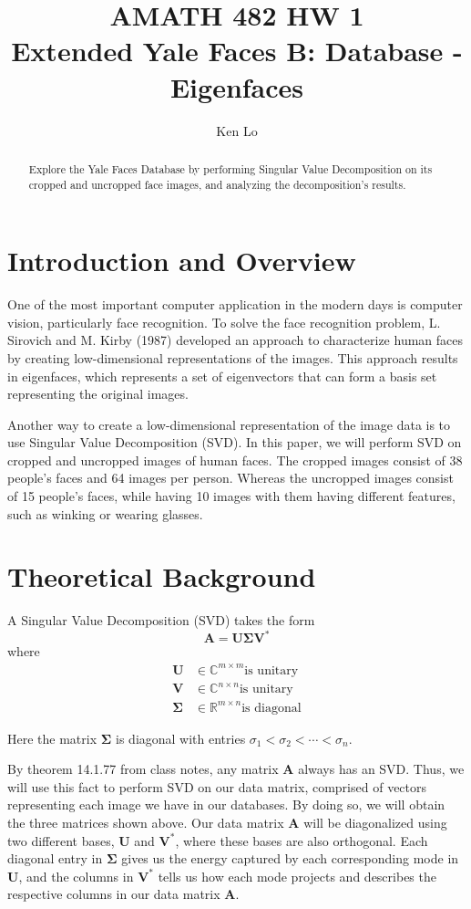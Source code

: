 \documentclass[12pt,a4paper]{article}
\author{Ken Lo}
\title{AMATH 482 HW 1\\
 Extended Yale Faces B: Database - Eigenfaces}
\begin{document}
\maketitle

\begin{abstract}
\noindent
Explore the Yale Faces Database by performing Singular Value Decomposition on its cropped and uncropped face images, and analyzing the decomposition's results.
\end{abstract}


\section{Introduction and Overview}
One of the most important computer application in the modern days is computer vision, particularly face recognition. To solve the face recognition problem, L. Sirovich and M. Kirby (1987) developed an approach to characterize human faces by creating low-dimensional representations of the images. This approach results in eigenfaces, which represents a set of eigenvectors that can form a basis set representing the original images.

Another way to create a low-dimensional representation of the image data is to use Singular Value Decomposition (SVD). In this paper, we will perform SVD on cropped and uncropped images of human faces. The cropped images consist of 38 people's faces and 64 images per person. Whereas the uncropped images consist of 15 people's faces, while having 10 images with them having different features, such as winking or wearing glasses.
\section{Theoretical Background}
A Singular Value Decomposition (SVD) takes the form
$$\mathbf{A} = \mathbf{U\Sigma V^*}$$
where
\begin{align*}
\mathbf{U} &\in \mathbb{C}^{m\times m} \text{is unitary}\\
\mathbf{V} &\in \mathbb{C}^{n \times n} \text{is unitary}\\
\mathbf{\Sigma} &\in \mathbb{R}^{m \times n} \text{is diagonal}
\end{align*}

\noindent
Here the matrix $\mathbf{\Sigma}$ is diagonal with entries $\sigma_1 < \sigma_2 < \cdots < \sigma_n$.

By theorem 14.1.77 from class notes, any matrix $\mathbf{A}$ always has an SVD. Thus, we will use this fact to perform SVD on our data matrix, comprised of vectors representing each image we have in our databases. By doing so, we will obtain the three matrices shown above. Our data matrix $\mathbf{A}$ will be diagonalized using two different bases, $\mathbf{U}$ and $\mathbf{V}^*$, where these bases are also orthogonal. Each diagonal entry in $\mathbf{\Sigma}$ gives us the energy captured by each corresponding mode in  $\mathbf{U}$, and the columns in $\mathbf{V}^*$ tells us how each mode projects and describes the respective columns in our data matrix $\mathbf{A}$.
\end{document}
